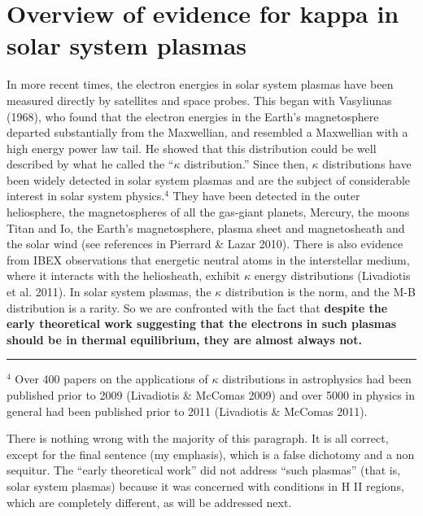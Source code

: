 \documentclass[11pt]{article}
\renewenvironment{quote}{\begin{shaded*}\small\sffamily}{\end{shaded*}}
\begin{document}
\section*{Overview of evidence for kappa in solar system plasmas}
\label{sec:orgheadline2}
\begin{quote}
In more recent times, the electron energies in solar system plasmas have been measured directly by satellites and space probes. This began with Vasyliunas (1968), who found that the electron energies in the Earth’s magnetosphere departed substantially from the Maxwellian, and resembled a Maxwellian with a high energy power law tail. He showed that this distribution could be well described by what he called the “\(\kappa\) distribution.” Since then, \(\kappa\) distributions have been widely detected in solar system plasmas and are the subject of considerable interest in solar system physics.\(^{4}\) They have been detected in the outer heliosphere, the magnetospheres of all the gas-giant planets, Mercury, the moons Titan and Io, the Earth’s magnetosphere, plasma sheet and magnetosheath and the solar wind (see references in Pierrard \& Lazar 2010). There is also evidence from IBEX observations that energetic neutral atoms in the interstellar medium, where it interacts with the heliosheath, exhibit \(\kappa\) energy distributions (Livadiotis et al. 2011). In solar system plasmas, the \(\kappa\) distribution is the norm, and the M-B distribution is a rarity. So we are confronted with the fact that \textbf{despite the early theoretical work suggesting that the electrons in such plasmas should be in thermal equilibrium, they are almost always not.}

\rule{\linewidth}{0.5pt}

\(^{4}\) Over 400 papers on the applications of \(\kappa\) distributions in astrophysics had been published prior to 2009 (Livadiotis \& McComas 2009) and over 5000 in physics in general had been published prior to 2011 (Livadiotis \& McComas 2011).
\end{quote}

There is nothing wrong with the majority of this paragraph.  It is all correct, except for the final sentence (my emphasis), which is a false dichotomy and a non sequitur. The ``early theoretical work'' did not address ``such plasmas'' (that is, solar system plasmas) because it was concerned with conditions in H II regions, which are completely different, as will be addressed next.
\end{document}
